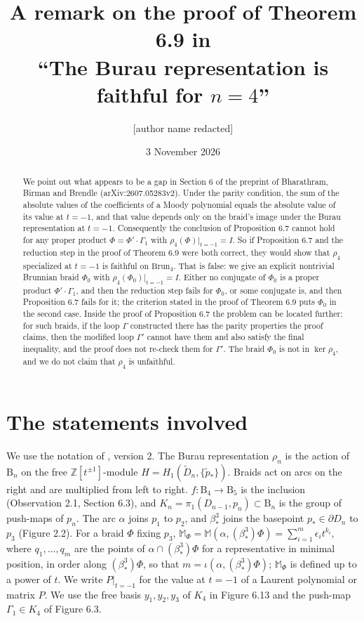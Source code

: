 \documentclass[11pt]{amsart}
\title[A remark on Section 6 of arXiv:2607.05283]{A remark on the proof of Theorem 6.9 in\\ ``The Burau representation is faithful for $n=4$''}
\author{[author name redacted]}
\date{3 November 2026}
\theoremstyle{remark}
\newcommand{\M}{\mathbb{M}}
\newcommand{\B}{\mathrm{B}}
\newcommand{\Brun}{\mathrm{Brun}}
\newcommand{\bs}{\beta^3_*}
\newcommand{\at}{\big|_{t=-1}}
\begin{document}
\begin{abstract}
We point out what appears to be a gap in Section 6 of the preprint \cite{BBB} of Bharathram, Birman and Brendle (arXiv:2607.05283v2). Under the parity condition, the sum of the absolute values of the coefficients of a Moody polynomial equals the absolute value of its value at $t=-1$, and that value depends only on the braid's image under the Burau representation at $t=-1$. Consequently the conclusion of Proposition 6.7 cannot hold for any proper product $\Phi=\Phi'\cdot\Gamma_1$ with $\rho_4(\Phi)\at=I$. So if Proposition 6.7 and the reduction step in the proof of Theorem 6.9 were both correct, they would show that $\rho_4$ specialized at $t=-1$ is faithful on $\Brun_4$. That is false: we give an explicit nontrivial Brunnian braid $\Phi_0$ with $\rho_4(\Phi_0)\at=I$. Either no conjugate of $\Phi_0$ is a proper product $\Phi'\cdot\Gamma_1$, and then the reduction step fails for $\Phi_0$, or some conjugate is, and then Proposition 6.7 fails for it; the criterion stated in the proof of Theorem 6.9 puts $\Phi_0$ in the second case. Inside the proof of Proposition 6.7 the problem can be located further: for such braids, if the loop $\Gamma$ constructed there has the parity properties the proof claims, then the modified loop $\Gamma'$ cannot have them and also satisfy the final inequality, and the proof does not re-check them for $\Gamma'$. The braid $\Phi_0$ is not in $\ker\rho_4$, and we do not claim that $\rho_4$ is unfaithful.
\end{abstract}

\maketitle

\section{The statements involved}

We use the notation of \cite{BBB}, version 2. The Burau representation $\rho_n$ is the action of $\B_n$ on the free $\mathbb{Z}[t^{\pm1}]$-module $H=H_1(\widetilde D_n,\{\tilde p_*\})$. Braids act on arcs on the right and are multiplied from left to right. $f\colon \B_4\to \B_5$ is the inclusion (Observation 2.1, Section 6.3), and $K_n=\pi_1(D_{n-1},p_n)\subset \B_n$ is the group of push-maps of $p_n$. The arc $\alpha$ joins $p_1$ to $p_2$, and $\bs$ joins the basepoint $p_*\in\partial D_n$ to $p_3$ (Figure 2.2). For a braid $\Phi$ fixing $p_3$, $\M_\Phi=\M(\alpha,(\bs)\Phi)=\sum_{i=1}^m\epsilon_i t^{k_i}$, where $q_1,\dots,q_m$ are the points of $\alpha\cap(\bs)\Phi$ for a representative in minimal position, in order along $(\bs)\Phi$, so that $m=\iota(\alpha,(\bs)\Phi)$; $\M_\Phi$ is defined up to a power of $t$. We write $P\at$ for the value at $t=-1$ of a Laurent polynomial or matrix $P$. We use the free basis $y_1,y_2,y_3$ of $K_4$ in Figure 6.13 and the push-map $\Gamma_1\in K_4$ of Figure 6.3.
\end{document}
